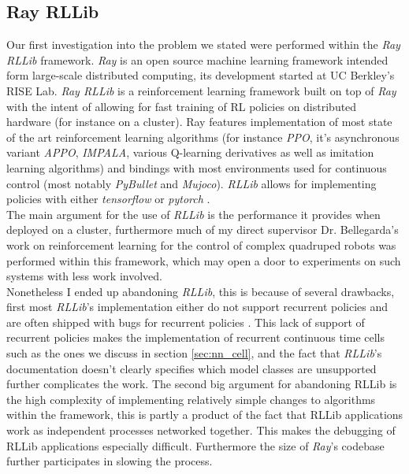 \subsection{Ray RLLib}

Our first investigation into the problem we stated were performed within the \textit{Ray RLLib} framework. \textit{Ray} is an open source machine learning framework intended form large-scale distributed computing, its development started at UC Berkley's RISE Lab. \textit{Ray RLLib} \cite{rllib} is a reinforcement learning framework built on top of \textit{Ray} with the intent of allowing for fast training of RL policies on distributed hardware (for instance on a cluster). Ray features implementation of most state of the art reinforcement learning algorithms (for instance \textit{PPO}, it's asynchronous variant \textit{APPO}, \textit{IMPALA}, various Q-learning derivatives as well as imitation learning algorithms) and bindings with most environments used for continuous control (most notably \textit{PyBullet} and \textit{Mujoco}). \textit{RLLib} allows for implementing policies with either \textit{tensorflow} \cite{tensorflow2015-whitepaper} or \textit{pytorch} \cite{PytorchPaper}. \\

The main argument for the use of \textit{RLLib} is the performance it provides when deployed on a cluster, furthermore much of my direct supervisor Dr. Bellegarda's work on reinforcement learning for the control of complex quadruped robots was performed within this framework, which may open a door to experiments on such systems with less work involved. \\

Nonetheless I ended up abandoning \textit{RLLib}, this is because of several drawbacks, first most \textit{RLLib}'s implementation either do not support recurrent policies and are often shipped with bugs for recurrent policies \cite{RLLib_Bug}. This lack of support of recurrent policies makes the implementation of recurrent continuous time cells such as the ones we discuss in section \ref{sec:nn_cell}, and the fact that \textit{RLLib}'s documentation doesn't clearly specifies which model classes are unsupported further complicates the work. The second big argument for abandoning RLLib is the high complexity of implementing relatively simple changes to algorithms within the framework, this is partly a product of the fact that RLLib applications work as independent processes networked together. This makes the debugging of RLLib applications especially difficult. Furthermore the size of \textit{Ray}'s codebase further participates in slowing the process.

